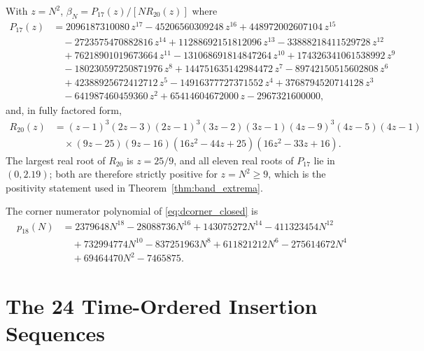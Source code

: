 \documentclass[11pt,a4paper]{article}
\theoremstyle{definition}
\begin{document}
With $z = N^2$, $\beta_N = P_{17}(z)/[N R_{20}(z)]$ where
\begin{align*}
  P_{17}(z) &= 2096187310080\,z^{17} - 45206560309248\,z^{16} + 448972002607104\,z^{15} \\
  &\quad - 2723575470882816\,z^{14} + 11288692151812096\,z^{13} - 33888218411529728\,z^{12} \\
  &\quad + 76218901019673664\,z^{11} - 131068691814847264\,z^{10} + 174326341061538992\,z^{9} \\
  &\quad - 180230597250871976\,z^{8} + 144751635142984472\,z^{7} - 89742150515602808\,z^{6} \\
  &\quad + 42388925672412712\,z^{5} - 14916377727371552\,z^{4} + 3768794520714128\,z^{3} \\
  &\quad - 641987460459360\,z^{2} + 65414604672000\,z - 2967321600000,
\end{align*}
and, in fully factored form,
\begin{align*}
  R_{20}(z) &= (z-1)^3 (2z-3)(2z-1)^3(3z-2)(3z-1)(4z-9)^3(4z-5)(4z-1) \\
  &\quad \times (9z-25)(9z-16)(16z^2-44z+25)(16z^2-33z+16).
\end{align*}
The largest real root of $R_{20}$ is $z = 25/9$, and all eleven real roots of $P_{17}$ lie in $(0,2.19)$; both are therefore strictly positive for $z = N^2 \ge 9$, which is the positivity statement used in Theorem~\ref{thm:band_extrema}.

The corner numerator polynomial of \eqref{eq:dcorner_closed} is
\begin{align*}
  p_{18}(N) &= 2379648N^{18} - 28088736N^{16} + 143075272N^{14} - 411323454N^{12} \\
  &\quad + 732994774N^{10} - 837251963N^8 + 611821212N^6 - 275614672N^4 \\
  &\quad + 69464470N^2 - 7465875 .
\end{align*}

\section{The 24 Time-Ordered Insertion Sequences}\label{app:orderings}
\end{document}
